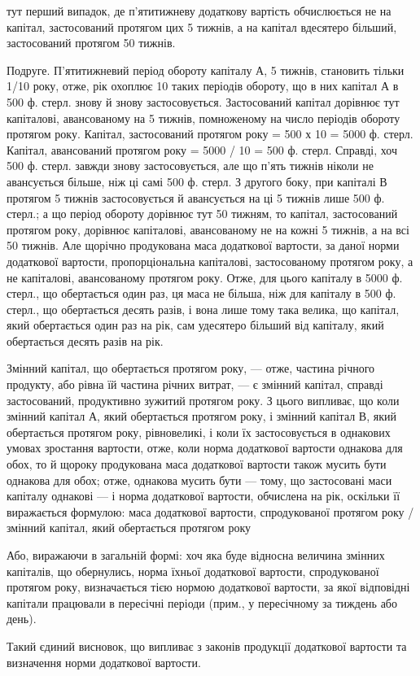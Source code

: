 тут перший випадок, де п’ятитижневу додаткову вартість обчислюється
не на капітал, застосований протягом цих 5 тижнів, а на капітал вдесятеро
більший, застосований протягом 50 тижнів.

Подруге. П’ятитижневий період обороту капіталу А, 5 тижнів,
становить тільки 1/10 року, отже, рік охоплює 10 таких періодів обороту,
що в них капітал А в 500 ф. стерл. знову й знову застосовується.
Застосований капітал дорівнює тут капіталові, авансованому на 5 тижнів,
помноженому на число періодів обороту протягом року. Капітал, застосований
протягом року = 500 х 10 = 5000 ф. стерл. Капітал, авансований
протягом року = 5000 / 10 = 500 ф. стерл. Справді, хоч 500 ф. стерл. завжди
знову застосовується, але що п’ять тижнів ніколи не авансується більше,
ніж ці самі 500 ф. стерл. З другого боку, при капіталі В протягом 5 тижнів
застосовується й авансується на ці 5 тижнів лише 500 ф. стерл.; а що
період обороту дорівнює тут 50 тижням, то капітал, застосований протягом
року, дорівнює капіталові, авансованому не на кожні 5 тижнів, а на
всі 50 тижнів. Але щорічно продукована маса додаткової вартости, за
даної норми додаткової вартости, пропорціональна капіталові, застосованому
протягом року, а не капіталові, авансованому протягом року. Отже, для
цього капіталу в 5000 ф. стерл., що обертається один раз, ця маса не
більша, ніж для капіталу в 500 ф. стерл., що обертається десять разів, і
вона лише тому така велика, що капітал, який обертається один раз на
рік, сам удесятеро більший від капіталу, який обертається десять разів
на рік.

Змінний капітал, що обертається протягом року, — отже, частина річного
продукту, або рівна їй частина річних витрат, — є змінний капітал,
справді застосований, продуктивно зужитий протягом року. З цього випливає,
що коли змінний капітал А, який обертається протягом року, і
змінний капітал В, який обертається протягом року, рівновеликі, і коли
їх застосовується в однакових умовах зростання вартости, отже, коли норма
додаткової вартости однакова для обох, то й щороку продукована
маса додаткової вартости також мусить бути однакова для обох; отже,
однакова мусить бути — тому, що застосовані маси капіталу однакові — і
норма додаткової вартости, обчислена на рік, оскільки її виражається
формулою:
маса додаткової вартости, спродукованої протягом року / змінний капітал, який обертається протягом
року

Або, виражаючи в загальній формі: хоч яка буде відносна величина
змінних капіталів, що обернулись, норма їхньої додаткової вартости,
спродукованої протягом року, визначається тією нормою додаткової вартости,
за якої відповідні капітали працювали в пересічні періоди (прим.,
у пересічному за тиждень або день).

Такий єдиний висновок, що випливає з законів продукції додаткової
вартости та визначення норми додаткової вартости.
